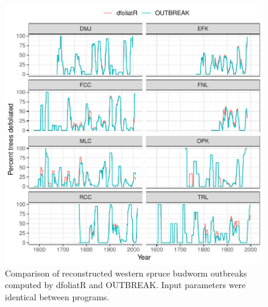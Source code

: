 \documentclass[review]{elsarticle} %
\makeatletter
\def\maxwidth{\ifdim\Gin@nat@width>\linewidth\linewidth
\else\Gin@nat@width\fi}
\let\Oldincludegraphics\includegraphics
\renewcommand{\includegraphics}[1]{\Oldincludegraphics[width=\maxwidth]{#1}}
\makeatother
\begin{document}
\begin{figure}
\centering
\includegraphics{../paper_elsevier/Output/plot-sites-df-obr.pdf}
\caption{\label{fig:df-obr-site}Comparison of reconstructed western spruce budworm outbreaks computed by dfoliatR and OUTBREAK. Input parameters were identical between programs.}
\end{figure}
\end{document}
